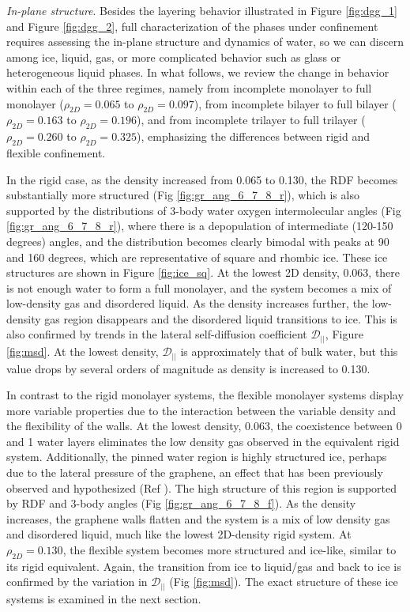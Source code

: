 \documentclass[12pt]{article}
\begin{document}
\textit{In-plane structure}. Besides the layering behavior illustrated in Figure \ref{fig:dgg_1} and Figure \ref{fig:dgg_2}, full characterization of the phases under confinement requires assessing the in-plane structure and dynamics of water, so we can discern among ice, liquid, gas, or more complicated behavior such as glass or heterogeneous liquid phases. In what follows, we review the change in behavior within each of the three regimes, namely from incomplete monolayer to full monolayer (\(\rho_{2D}=0.065\) to \(\rho_{2D}=0.097\)), from incomplete bilayer to full bilayer (\(\rho_{2D}=0.163\) to \(\rho_{2D}=0.196\)), and from incomplete trilayer to full trilayer (\(\rho_{2D}=0.260\) to \(\rho_{2D}=0.325\)), emphasizing the differences between rigid and flexible confinement.

 In the rigid case, as the density increased from 0.065 to 0.130, the RDF becomes substantially more structured (Fig \ref{fig:gr_ang_6_7_8_r}), which is also supported by the distributions of 3-body water oxygen intermolecular angles (Fig \ref{fig:gr_ang_6_7_8_r}), where there is a depopulation of intermediate (120-150 degrees) angles, and the distribution becomes clearly bimodal with peaks at 90 and 160 degrees, which are representative of square and rhombic ice. These ice structures are shown in Figure \ref{fig:ice_sq}. At the lowest 2D density, 0.063, there is not enough water to form a full monolayer, and the system becomes a mix of low-density gas and disordered liquid. As the density increases further, the low-density gas region disappears and the disordered liquid transitions to ice. This is also confirmed by trends in the lateral self-diffusion coefficient \(\mathcal{D}_{||}\), Figure \ref{fig:msd}. At the lowest density, \(\mathcal{D}_{||}\) is approximately that of bulk water, but this value drops by several orders of magnitude as density is increased to 0.130. 

In contrast to the rigid monolayer systems, the flexible monolayer systems display more variable properties due to the interaction between the variable density and the flexibility of the walls. At the lowest density, 0.063, the coexistence between 0 and 1 water layers eliminates the low density gas observed in the equivalent rigid system. Additionally, the pinned water region is highly structured ice, perhaps due to the lateral pressure of the graphene, an effect that has been previously observed and hypothesized (Ref \cite{Algara-Siller2015}). The high structure of this region is supported by RDF and 3-body angles (Fig \ref{fig:gr_ang_6_7_8_f}). As the density increases, the graphene walls flatten and the system is a mix of low density gas and  disordered liquid, much like the lowest 2D-density rigid system. At \(\rho_{2D}=0.130\), the flexible system becomes more structured and ice-like, similar to its rigid equivalent. Again, the transition from ice to liquid/gas and back to ice is confirmed by the variation in \(\mathcal{D}_{||}\) (Fig \ref{fig:msd}). The exact structure of these ice systems is examined in the next section. 
\end{document}
